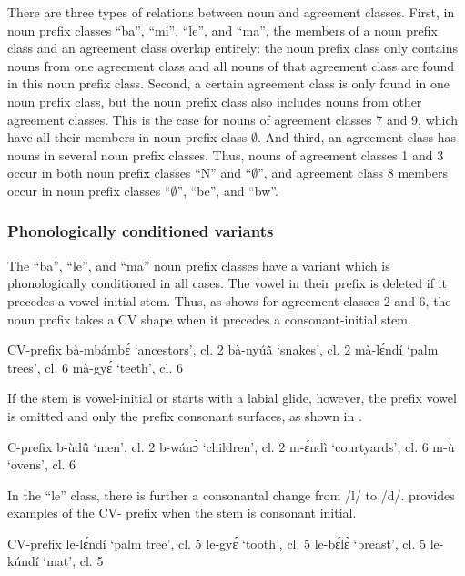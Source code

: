 \largerpage
There are three types of relations between noun and agreement classes. First, in noun prefix classes ``ba'', ``mi'', ``le'', and ``ma'', the members of a noun prefix class and an agreement class overlap entirely: the noun prefix class only contains nouns from one agreement class and all nouns of that agreement class are found in this noun prefix class. Second, a certain agreement class is only found in one noun prefix class, but the noun prefix class also includes nouns from other agreement classes. This is the case for nouns of agreement classes 7 and 9, which have all their members in noun prefix class $\emptyset$. And third, an agreement class has nouns in several noun prefix classes.  Thus, nouns of agreement classes 1 and 3 occur in both noun prefix classes ``N'' and ``$\emptyset$'', and agreement class 8 members occur in noun prefix classes ``$\emptyset$'', ``be'', and ``bw''.



\subsubsection{Phonologically conditioned variants} 

The ``ba'', ``le'', and ``ma'' noun prefix classes have a variant which is phonologically conditioned in all cases. The vowel in their prefix is deleted if it precedes a vowel-initial stem. Thus, as  shows for agreement classes 2 and 6, the noun prefix takes a CV shape when it precedes a consonant-initial stem.

\ea\label{CVprefix} CV-prefix
\ea bà-mbámbɛ́ `ancestors', cl. 2
\ex bà-nyúã̀ `snakes', cl. 2
\ex mà-lɛ́ndí `palm trees', cl. 6
\ex mà-gyɛ́ `teeth', cl. 6
\z
\z

\noindent If the stem is vowel-initial or starts with a labial glide, however, the prefix vowel is omitted and only the prefix consonant surfaces, as shown in .

\ea\label{Cprefix} C-prefix
\ea b-ùdũ̂ `men', cl. 2
\ex b-wánɔ̀ `children', cl. 2
\ex m-ɛ́ndì `courtyards', cl. 6
\ex m-ù `ovens', cl. 6
\z
\z


In the ``le'' class, there is further a consonantal change from /l/ to /d/.  provides examples of the CV- prefix when the stem is consonant initial.

\ea\label{CVprefixle} CV-prefix
\ea le-lɛ́ndí `palm tree', cl. 5
\ex le-gyɛ́ `tooth', cl. 5
\ex le-bɛ́lɛ̀ `breast', cl. 5
\ex le-kúndí `mat', cl. 5
\z
\z

